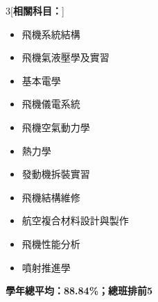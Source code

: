 \documentclass[11 pt,oneside,a4paper,titlepage]{article}
\begin{document}
{\begin{minipage}{13.1cm}
{    \begin{multicols}{3}[\textbf{相關科目：}]
    \begin{itemize}[label=\faCaretRight]
        \item 飛機系統結構
        \item 飛機氣液壓學及實習
        \item 基本電學
        \item 飛機儀電系統
        \item 飛機空氣動力學
        \item 熱力學
        \item 發動機拆裝實習
        \item 飛機結構維修
        \item 航空複合材料設計與製作
        \item 飛機性能分析
        \item 噴射推進學
    \end{itemize}
    \end{multicols}
    \textbf{學年總平均：88.84\%；總班排前5}}
\end{minipage}} %
\newpage

\end{document}
